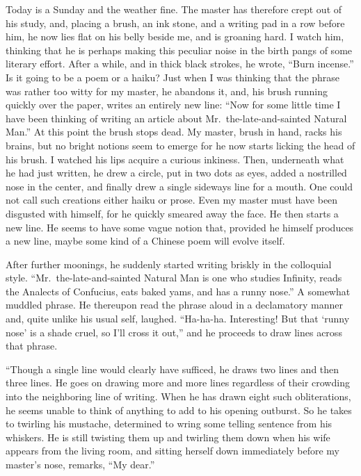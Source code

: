 \documentclass[12pt, openright]{book}
\begin{document}
Today is a Sunday and the weather fine. The master has therefore crept
out of his study, and, placing a brush, an ink stone, and a writing pad
in a row before him, he now lies flat on his belly beside me, and is
groaning hard. I watch him, thinking that he is perhaps making this
peculiar noise in the birth pangs of some literary effort. After a
while, and in thick black strokes, he wrote, ``Burn incense.'' Is it
going to be a poem or a haiku? Just when I was thinking that the phrase
was rather too witty for my master, he abandons it, and, his brush
running quickly over the paper, writes an entirely new line: ``Now for
some little time I have been thinking of writing an article about
Mr.~the-late-and-sainted Natural Man.'' At this point the brush stops
dead. My master, brush in hand, racks his brains, but no bright notions
seem to emerge for he now starts licking the head of his brush. I
watched his lips acquire a curious inkiness. Then, underneath what he
had just written, he drew a circle, put in two dots as eyes, added a
nostrilled nose in the center, and finally drew a single sideways line
for a mouth. One could not call such creations either haiku or prose.
Even my master must have been disgusted with himself, for he quickly
smeared away the face. He then starts a new line. He seems to have some
vague notion that, provided he himself produces a new line, maybe some
kind of a Chinese poem will evolve itself.

After further moonings, he suddenly started writing briskly in the
colloquial style. ``Mr.~the-late-and-sainted Natural Man is one who
studies Infinity, reads the Analects of Confucius, eats baked yams, and
has a runny nose.'' A somewhat muddled phrase. He thereupon read the
phrase aloud in a declamatory manner and, quite unlike his usual self,
laughed. ``Ha-ha-ha. Interesting! But that `runny nose' is a shade
cruel, so I'll cross it out,'' and he proceeds to draw lines across that
phrase.

``Though a single line would clearly have sufficed, he draws two lines
and then three lines. He goes on drawing more and more lines regardless
of their crowding into the neighboring line of writing. When he has
drawn eight such obliterations, he seems unable to think of anything to
add to his opening outburst. So he takes to twirling his mustache,
determined to wring some telling sentence from his whiskers. He is still
twisting them up and twirling them down when his wife appears from the
living room, and sitting herself down immediately before my master's
nose, remarks, ``My dear.''
\end{document}
